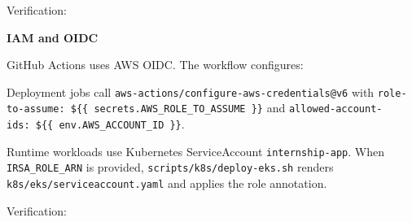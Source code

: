 Verification:

\begin{Shaded}
\begin{Highlighting}[]
\end{Highlighting}
\end{Shaded}

\vspace{0.5em}\noindent\textbf{IAM and OIDC}\par

GitHub Actions uses AWS OIDC. The workflow configures:

\begin{Shaded}
\begin{Highlighting}[]
\KeywordTok{:}
\AttributeTok{  }\KeywordTok{:}
\AttributeTok{  }\KeywordTok{:}
\end{Highlighting}
\end{Shaded}

Deployment jobs call \texttt{aws-\allowbreak{}actions/\allowbreak{}configure-\allowbreak{}aws-\allowbreak{}credentials@v6}
with
\texttt{role-to-assume:\ \$\{\{\ secrets.AWS\_ROLE\_TO\_ASSUME\ \}\}}
and \texttt{allowed-account-ids:\ \$\{\{\ env.AWS\_ACCOUNT\_ID\ \}\}}.

Runtime workloads use Kubernetes ServiceAccount \texttt{internship-\allowbreak{}app}.
When \texttt{IRSA\_\allowbreak{}ROLE\_\allowbreak{}ARN} is provided,
\texttt{scripts/\allowbreak{}k8s/\allowbreak{}deploy-\allowbreak{}eks.\allowbreak{}sh} renders
\texttt{k8s/\allowbreak{}eks/\allowbreak{}serviceaccount.\allowbreak{}yaml} and applies the role annotation.

Verification:

\begin{Shaded}
\begin{Highlighting}[]
\end{Highlighting}
\end{Shaded}

